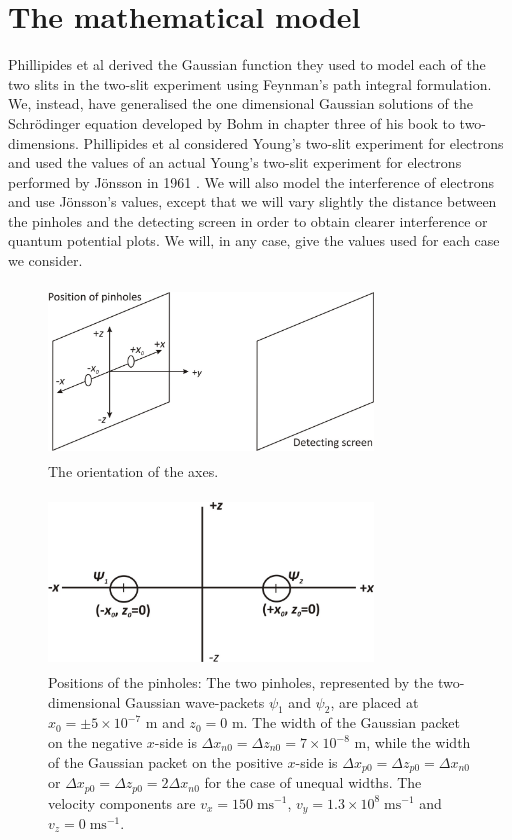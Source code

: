 \documentclass[12pt]{article}       %
\begin{document}
\section{The mathematical model\label{MM}}
Phillipides et al \cite{DEWD79} derived the Gaussian function they used to model each of the two slits in the two-slit experiment using Feynman's path integral formulation. We, instead, have generalised the one dimensional Gaussian solutions of the Schr\"{o}dinger equation developed by Bohm in chapter three of his book \cite{B51} to two-dimensions. Phillipides et al \cite{DEWD79} considered Young's two-slit experiment for electrons and used the values of an actual  Young's two-slit experiment for electrons performed by J\"{o}nsson in 1961 \cite{jon61}. We will also model the interference of electrons and use  J\"{o}nsson's values, except that we will vary slightly the distance between the pinholes and the detecting screen in order to obtain clearer interference or quantum potential plots. We will, in any case,  give the values used for each case we consider. 
\pagebreak

\begin{figure}[ht]
\unitlength=1in
\hspace*{1.3in}\includegraphics[width=3.4in,height=1.8in]{figure1.jpg}  
\caption{The orientation of the axes.\label{OrAxes}}
\end{figure}
\begin{figure}[ht]
\unitlength=1in
\hspace*{1.3in}\includegraphics[width=3.4in,height=1.8in]  {figure2.jpg}  
\caption{Positions of the pinholes: The two pinholes, represented by the two-dimensional Gaussian wave-packets $\psi_1$ and $\psi_2$, are placed at $x_0=\pm5\times10^{-7}$ m and  $z_0=0$ m. The width of  the Gaussian packet on the negative $x$-side is $\Delta x_{n0}=\Delta z_{n0}=7\times 10^{-8}$ m, while the width  of the Gaussian packet on the positive $x$-side is $\Delta x_{p0}=\Delta z_{p0}=\Delta x_{n0}$  or $\Delta x_{p0}=\Delta z_{p0}=2\Delta x_{n0}$ for the case of unequal widths.  The velocity components are  $v_x=150\;\mathrm{ms}^{-1}$, $v_y=1.3\times 10^{8}\;\mathrm{ms}^{-1}$ and  $v_z=0\;\mathrm{ms}^{-1}$.\label{figPos} }
\end{figure}
\end{document}
